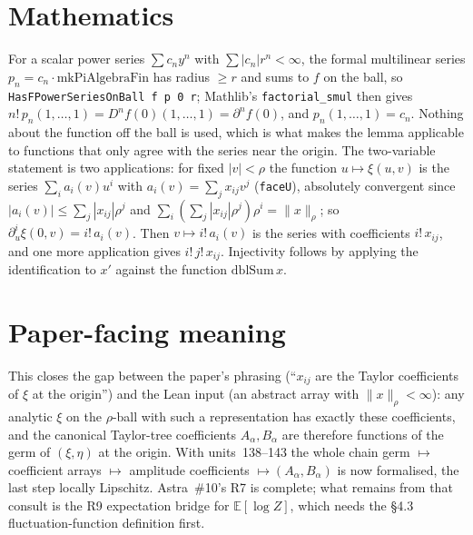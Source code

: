 \documentclass[11pt]{article}
\begin{document}
\section{Mathematics}
For a scalar power series $\sum c_ny^n$ with $\sum|c_n|r^n<\infty$, the formal multilinear series
$p_n=c_n\cdot\mathrm{mkPiAlgebraFin}$ has radius $\ge r$ and sums to $f$ on the ball, so
\texttt{HasFPowerSeriesOnBall f p 0 r}; Mathlib's \texttt{factorial\_smul} then gives
$n!\,p_n(1,\dots,1)=D^nf(0)(1,\dots,1)=\partial^nf(0)$, and $p_n(1,\dots,1)=c_n$. Nothing about
the function off the ball is used, which is what makes the lemma applicable to functions that only
agree with the series near the origin. The two-variable statement is two applications: for fixed
$|v|<\rho$ the function $u\mapsto\xi(u,v)$ is the series $\sum_ia_i(v)u^i$ with
$a_i(v)=\sum_jx_{ij}v^j$ (\texttt{faceU}), absolutely convergent since
$|a_i(v)|\le\sum_j|x_{ij}|\rho^j$ and $\sum_i(\sum_j|x_{ij}|\rho^j)\rho^i=\|x\|_\rho$; so
$\partial_u^i\xi(0,v)=i!\,a_i(v)$. Then $v\mapsto i!\,a_i(v)$ is the series with coefficients
$i!\,x_{ij}$, and one more application gives $i!\,j!\,x_{ij}$. Injectivity follows by applying the
identification to $x'$ against the function $\mathrm{dblSum}\,x$.

\section{Paper-facing meaning}
This closes the gap between the paper's phrasing (``$x_{ij}$ are the Taylor coefficients of $\xi$
at the origin'') and the Lean input (an abstract array with $\|x\|_\rho<\infty$): any analytic
$\xi$ on the $\rho$-ball with such a representation has exactly these coefficients, and the
canonical Taylor-tree coefficients $A_\alpha,B_\alpha$ are therefore functions of the germ of
$(\xi,\eta)$ at the origin. With units~138--143 the whole chain germ $\mapsto$ coefficient arrays
$\mapsto$ amplitude coefficients $\mapsto(A_\alpha,B_\alpha)$ is now formalised, the last step
locally Lipschitz. Astra~\#10's R7 is complete; what remains from that consult is the R9 expectation
bridge for $\mathbb E[\log Z]$, which needs the §4.3 fluctuation-function definition first.
\end{document}
